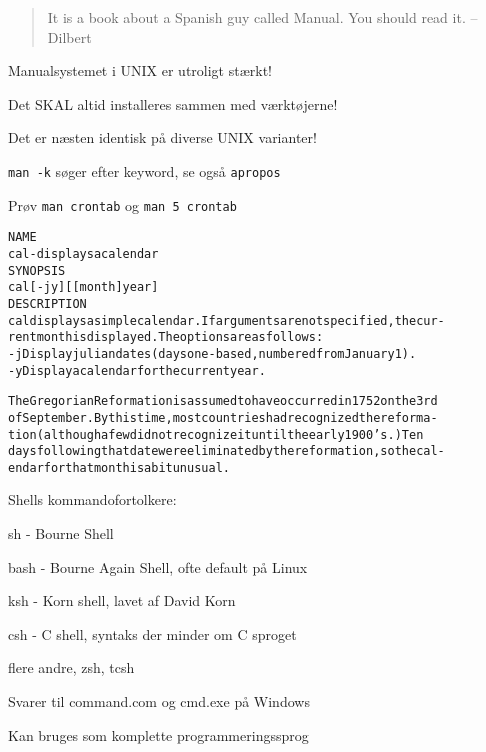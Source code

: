 \documentclass[Screen16to9,17pt]{foils}
\begin{document}


\begin{quote}
 It is a book about a Spanish guy called Manual. You should read it.
       -- Dilbert
\end{quote}

\begin{list1}
\item Manualsystemet i UNIX er utroligt stærkt!
\item Det SKAL altid installeres sammen med værktøjerne!
\item Det er næsten identisk på diverse UNIX varianter!
\item \verb+man -k+ søger efter keyword, se også \verb+apropos+
\end{list1}

Prøv \verb+man crontab+ og \verb+man 5 crontab+




\begin{alltt}\footnotesize
\small
NAME
     cal - displays a calendar
SYNOPSIS
     cal [-jy] [[month]  year]
DESCRIPTION
   cal displays a simple calendar.  If arguments are not specified, the cur-
   rent month is displayed.  The options are as follows:
   -j      Display julian dates (days one-based, numbered from January 1).
   -y      Display a calendar for the current year.

The Gregorian Reformation is assumed to have occurred in 1752 on the 3rd
of September.  By this time, most countries had recognized the reforma-
tion (although a few did not recognize it until the early 1900's.)  Ten
days following that date were eliminated by the reformation, so the cal-
endar for that month is a bit unusual.
\end{alltt}


\begin{list1}
\item Shells kommandofortolkere:
  \begin{list2}
    \item sh - Bourne Shell
\item bash - Bourne Again Shell, ofte default på Linux
\item ksh - Korn shell, lavet af David Korn
\item csh - C shell, syntaks der minder om C sproget
\item flere andre, zsh, tcsh
  \end{list2}
\item Svarer til command.com og cmd.exe på Windows
\item Kan bruges som komplette programmeringssprog
\end{list1}
\end{document}
